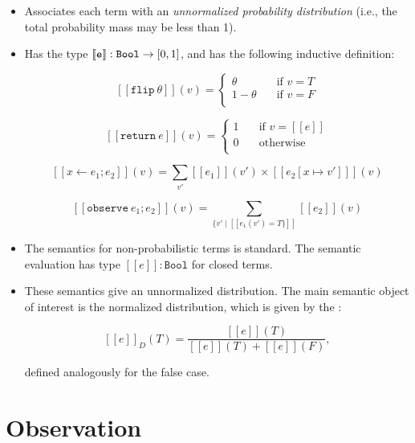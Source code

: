 \documentclass{tufte-handout}
\begin{document}
\begin{itemize}
\item Associates each term with an \emph{unnormalized probability distribution} 
(i.e., the total probability mass may be less than 1).
\item Has the type $\left \llbracket {\texttt{e}} \right \rrbracket : \texttt{Bool} \rightarrow [0, 1]$,
and has the following inductive definition:

$$
[\![\texttt{flip}~\theta]\!](v) = 
\begin{cases}
\theta& \quad \text{if }v = T\\
1-\theta& \quad \text{if }v = F\\
\end{cases}
$$

$$
 [\![\texttt{return}~e]\!](v) = 
 \begin{cases}
 1\quad& \text{if }v = [\![e]\!]\\
 0\quad&  \text{otherwise}\\
 \end{cases}
$$

$$
[\![x \leftarrow e_1; e_2]\!](v) = \sum_{v'} [\![{e_1}]\!](v') \times [\![{e_2[x \mapsto v']}]\!](v)
$$

$$
[\![\texttt{observe}~e_1; e_2]\!](v) = 
\sum_{\{v' \mid [\![{e_1}(v') = T\}]\!]} [\![{e_2}]\!](v)
$$

\item The semantics for non-probabilistic terms is standard. The semantic evaluation has type 
$[[e]]: \texttt{Bool}$ for closed terms.

\item These semantics give an unnormalized distribution. The main semantic object of interest is 
the normalized distribution, which is given by the :

$$
[\![e]\!]_D(T) = \frac{[\![e]\!](T)}{[\![e]\!](T) + [\![e]\!](F) },
$$

defined analogously for the false case.
\end{itemize}


\section{Observation}
\end{document}
